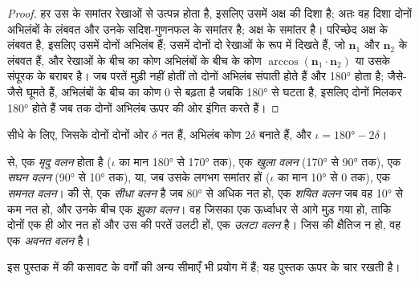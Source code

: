 \begin{proof}
हर  उस  के समांतर रेखाओं से उत्पन्न होता है, इसलिए उसमें अक्ष की दिशा है; अतः वह दिशा दोनों अभिलंबों के लंबवत और उनके सदिश-गुणनफल के समांतर है;  अक्ष के समांतर है। परिच्छेद अक्ष के लंबवत है, इसलिए उसमें दोनों अभिलंब हैं; उसमें दोनों  दो रेखाओं के रूप में दिखते हैं, जो $\mathbf n_1$ और $\mathbf n_2$ के लंबवत हैं, और रेखाओं के बीच का कोण अभिलंबों के बीच के कोण $\arccos(\mathbf n_1\cdot\mathbf n_2)$ या उसके संपूरक के बराबर है। जब परतें मुड़ी नहीं होतीं तो दोनों अभिलंब संपाती होते हैं और  \ang{180} होता है; जैसे-जैसे  घूमते हैं, अभिलंबों के बीच का कोण $0$ से बढ़ता है जबकि  \ang{180} से घटता है, इसलिए दोनों मिलकर \ang{180} होते हैं जब तक दोनों अभिलंब ऊपर की ओर इंगित करते हैं।
\end{proof}

सीधे  के लिए, जिसके दोनों  दोनों ओर $\delta$ नत हैं, अभिलंब कोण $2\delta$ बनाते हैं, और $\iota = \ang{180} - 2\delta$।

\begin{definition}[वलनों के वर्ग]\label{def:b1:faults-folds-fabrics:fold-classes}
 से, एक  \emph{मृदु वलन} होता है ($\iota$ का मान \ang{180} से \ang{170} तक), एक \emph{खुला वलन} (\ang{170} से \ang{90} तक), एक \emph{सघन वलन} (\ang{90} से \ang{10} तक), या, जब उसके  लगभग समांतर हों ($\iota$ का मान \ang{10} से $0$ तक), एक \emph{समनत वलन}।  की  से, एक  \emph{सीधा वलन} है जब  \ang{80} से अधिक नत हो, एक \emph{शयित वलन} जब वह \ang{10} से कम नत हो, और उनके बीच एक \emph{झुका वलन}। वह  जिसका एक  ऊर्ध्वाधर से आगे मुड़ गया हो, ताकि दोनों  एक ही ओर नत हों और उस  की परतें उलटी हों, एक \emph{उलटा वलन} है। जिस  की  क्षैतिज न हो, वह एक \emph{अवनत वलन} है।
\end{definition}
इस पुस्तक में  की कसावट के वर्गों की अन्य सीमाएँ भी प्रयोग में हैं; यह पुस्तक ऊपर के चार रखती है।

